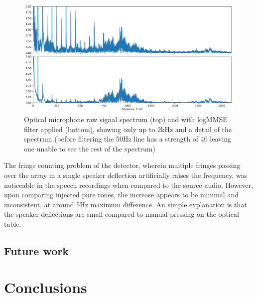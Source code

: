 \documentclass[prb,preprint]{revtex4-1}
\begin{document}
\begin{figure}%
	\includegraphics[width=\textwidth]{filter_spectrum_aa_melatos-cropped.pdf}
	\caption{Optical microphone raw signal spectrum (top) and with logMMSE filter applied (bottom), showing only up to 2kHz and a detail of the spectrum (before filtering the 50Hz line has a strength of 40 leaving one unable to see the rest of the spectrum)}
	\label{fig:logMMSE_spectrum}
\end{figure}

The fringe counting problem of the detector, wherein multiple fringes passing over the array in a single speaker deflection artificially raises the frequency, was noticeable in the speech recordings when compared to the source audio. However, upon comparing injected pure tones, the increase appears to be minimal and inconsistent, at around 5Hz maximum difference. An simple explanation is that the speaker deflections are small compared to manual pressing on the optical table.

\subsection{Future work}


\section{Conclusions}


\appendix

\newpage
\end{document}
